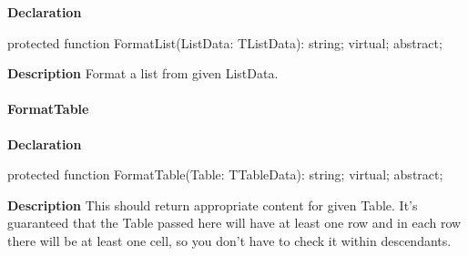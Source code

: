 \documentclass{report}
\newif\ifpdf
\begin{document}
\label{PasDoc_Gen.TDocGenerator-FormatList}
\begin{list}{}{
\setlength{\itemindent}{0cm}
\setlength{\listparindent}{0cm}
\setlength{\leftmargin}{\evensidemargin}
\addtolength{\leftmargin}{\tmplength}
\settowidth{\labelsep}{X}
\addtolength{\leftmargin}{\labelsep}
\setlength{\labelwidth}{\tmplength}
}
\item[\textbf{Declaration}\hfill]
\ifpdf
\begin{flushleft}
\fi
\begin{ttfamily}
protected function FormatList(ListData: TListData): string; virtual; abstract;\end{ttfamily}

\ifpdf
\end{flushleft}
\fi

\par
\item[\textbf{Description}]
Format a list from given ListData.

\end{list}
\paragraph*{FormatTable}\hspace*{\fill}

\label{PasDoc_Gen.TDocGenerator-FormatTable}
\begin{list}{}{
\setlength{\itemindent}{0cm}
\setlength{\listparindent}{0cm}
\setlength{\leftmargin}{\evensidemargin}
\addtolength{\leftmargin}{\tmplength}
\settowidth{\labelsep}{X}
\addtolength{\leftmargin}{\labelsep}
\setlength{\labelwidth}{\tmplength}
}
\item[\textbf{Declaration}\hfill]
\ifpdf
\begin{flushleft}
\fi
\begin{ttfamily}
protected function FormatTable(Table: TTableData): string; virtual; abstract;\end{ttfamily}

\ifpdf
\end{flushleft}
\fi

\par
\item[\textbf{Description}]
This should return appropriate content for given Table. It's guaranteed that the Table passed here will have at least one row and in each row there will be at least one cell, so you don't have to check it within descendants.

\end{list}
\end{document}
